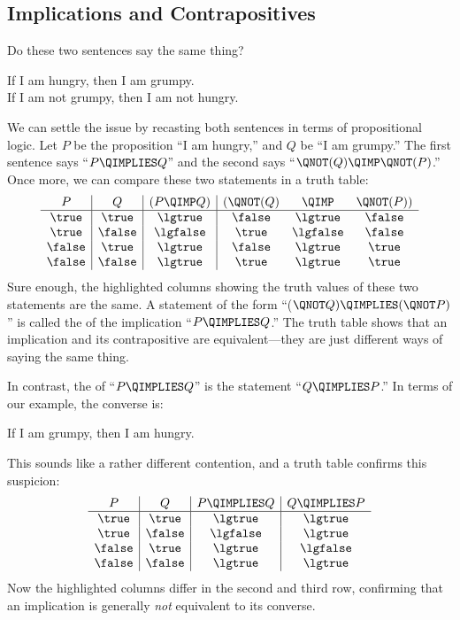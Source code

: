 \subsection{Implications and Contrapositives}\label{implication_sec}
Do these two sentences say the same thing?
%
\begin{center}
If I am hungry, then I am grumpy. \\
If I am not grumpy, then I am not hungry.
\end{center}
%
We can settle the issue by recasting both sentences in terms of
propositional logic.  Let $P$ be the proposition ``I am hungry,'' and $Q$
be ``I am grumpy.''  The first sentence says ``$P \QIMPLIES Q$'' and the
second says ``$\QNOT(Q) \QIMP \QNOT(P)$.''  Once more, we can compare
these two statements in a truth table:
%
\[
\begin{array}{c|c|c|ccc}
   P   &   Q    & (P  \QIMP  Q) & (\QNOT(Q) & \QIMP & \QNOT(P)) \\ \hline
\true  & \true  &     \lgtrue   &  \false   & \lgtrue  &  \false\\
\true  & \false &     \lgfalse  &  \true    & \lgfalse &  \false\\
\false & \true  &     \lgtrue   &  \false   & \lgtrue  &  \true \\
\false & \false &     \lgtrue   &  \true    & \lgtrue  &  \true \\
\end{array}
\]
%
Sure enough, the highlighted columns showing the truth values of these two
statements are the same.  A statement of the form ``($\QNOT Q) \QIMPLIES
(\QNOT P)$'' is called the  of the implication ``$P
\QIMPLIES Q$.''  The truth table shows that an implication and its
contrapositive are equivalent---they are just different ways of saying
the same thing.

In contrast, the  of ``$P \QIMPLIES Q$'' is the statement
``$Q \QIMPLIES P$.''  In terms of our example, the converse is:
%
\begin{center}
If I am grumpy, then I am hungry.
\end{center}
%
This sounds like a rather different contention, and a truth table
confirms this suspicion:
%
\[
\begin{array}{c|c|c|c}
P & Q &
    P \QIMPLIES Q &
    Q \QIMPLIES P \\ \hline
\true & \true & \lgtrue & \lgtrue \\
\true & \false & \lgfalse & \lgtrue \\
\false & \true & \lgtrue & \lgfalse \\
\false & \false & \lgtrue & \lgtrue
\end{array}
\]
%
Now the highlighted columns differ in the second and third row, confirming
that an implication is generally \textit{not} equivalent to its converse.


